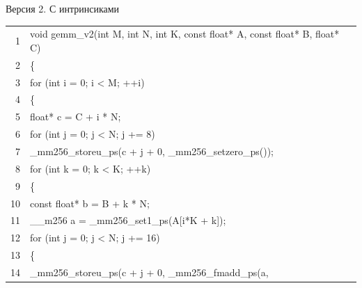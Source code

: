 \documentclass[aspectratio=169, 11pt]{beamer}
\newcommand{\K}[1]{\textcolor{kw}{#1}}   %
\newcommand{\T}[1]{\textcolor{tp}{#1}}   %
\newcommand{\N}[1]{\textcolor{nm}{#1}}   %
\newcommand{\V}[1]{\textcolor{vr}{#1}}   %
\begin{document}
\begin{frame}[fragile]{Версия 2. С интринсиками}
	\ttfamily\footnotesize
	\setlength{\baselineskip}{1.1em}
	\setlength{\parindent}{0pt}
	
	\begingroup
	\setlength{\fboxsep}{7pt}%
	\colorbox{codebg}{%
		\begin{minipage}{\dimexpr\linewidth-2\fboxsep\relax}
			\begin{tabular}{@{}r@{\hspace{1.2em}}l@{}}
				\textcolor{ln}{1} & \K{void} \V{gemm\_v2}(\T{int} \V{M}, \T{int} \V{N}, \T{int} \V{K}, \T{const} \T{float*} \V{A}, \T{const} \T{float*} \V{B}, \T{float*} \V{C}) \\
				\textcolor{ln}{2} & \{ \\
				\textcolor{ln}{3} & \hspace{1.5em}\K{for} (\T{int} \V{i} = \N{0}; \V{i} < \V{M}; ++\V{i}) \\
				\textcolor{ln}{4} & \hspace{1.5em}\{ \\
				\textcolor{ln}{5} & \hspace{3em}\T{float*} \V{c} = \V{C} + \V{i} * \V{N}; \\
				\textcolor{ln}{6} & \hspace{3em}\K{for} (\T{int} \V{j} = \N{0}; \V{j} < \V{N}; \V{j} += \N{8}) \\
				\textcolor{ln}{7} & \hspace{4.5em}\V{\_mm256\_storeu\_ps}(\V{c} + \V{j} + \N{0}, \V{\_mm256\_setzero\_ps}()); \\
				\textcolor{ln}{8} & \hspace{3em}\K{for} (\T{int} \V{k} = \N{0}; \V{k} < \V{K}; ++\V{k}) \\
				\textcolor{ln}{9} & \hspace{3em}\{ \\
				\textcolor{ln}{10} & \hspace{4.5em}\T{const} \T{float*} \V{b} = \V{B} + \V{k} * \V{N}; \\
				\textcolor{ln}{11} & \hspace{4.5em}\V{\_\_m256} \V{a} = \V{\_mm256\_set1\_ps}(\V{A}[\V{i}*\V{K} + \V{k}]); \\
				\textcolor{ln}{12} & \hspace{4.5em}\K{for} (\T{int} \V{j} = \N{0}; \V{j} < \V{N}; \V{j} += \N{16}) \\
				\textcolor{ln}{13} & \hspace{4.5em}\{ \\
				\textcolor{ln}{14} & \hspace{6em}\V{\_mm256\_storeu\_ps}(\V{c} + \V{j} + \N{0}, \V{\_mm256\_fmadd\_ps}(\V{a}, \\

\end{tabular}
\end{minipage}}
\end{frame}
\end{document}
